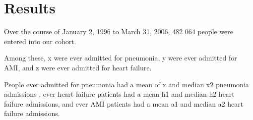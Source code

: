 \documentclass[]{article}\usepackage[]{graphicx}\usepackage[]{color}
\begin{document}
\section{Results}



Over the course of January 2, 1996 to March 31, 2006, 482 064 people were entered into our cohort. 

Among these, x were ever admitted for pneumonia, y were ever admitted for AMI, and z were ever admitted for heart failure. 

People ever admitted for pneumonia had a mean of x and median x2 pneumonia admissions , ever heart failure patients had a mean h1 and median h2 heart failure admissions, and ever AMI patients had a mean a1 and median a2 heart failure admissions.
\end{document}
